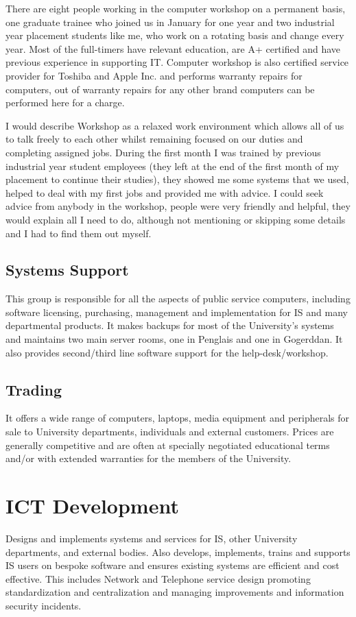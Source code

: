 \documentclass[10pt,a4paper,headinclude=true]{report}
\begin{document}
There are eight people working in the computer workshop on a permanent basis, one graduate trainee who joined us in January for one year and two industrial year placement students like me, who work on a rotating basis and change every year. Most of the full-timers have relevant education, are A+ certified\cite{A+} and have previous experience in supporting IT. Computer workshop is also certified service provider for Toshiba and Apple Inc. and performs warranty repairs for computers, out of warranty repairs for any other brand computers can be performed here for a charge. 

I would describe Workshop as a relaxed work environment which allows all of us to talk freely to each other whilst remaining focused on our duties and completing assigned jobs. During the first month I was trained by previous industrial year student employees (they left at the end of the first month of my placement to continue their studies), they showed me some systems that we used, helped to deal with my first jobs and provided me with advice. I could seek advice from anybody in the workshop, people were very friendly and helpful, they would explain all I need to do, although not mentioning or skipping some details and I had to find them out myself.
\subsection{Systems Support}
This group is responsible for all the aspects of public service computers, including software licensing, purchasing, management and implementation for IS and many departmental products. It makes backups for most of the University's systems and maintains two main server rooms, one in Penglais and one in Gogerddan. It also provides second/third line software support for the help-desk/workshop.\cite{InternalTeamdescription}
\subsection{Trading}
It offers a wide range of computers, laptops, media equipment and peripherals for sale to University departments, individuals and external customers. Prices are generally competitive and are often at specially negotiated educational terms and/or with extended warranties for the members of the University.\cite{InternalTeamdescription}

\section{ICT Development}
Designs and implements systems and services for IS, other University departments, and external bodies. Also develops, implements, trains and supports IS users on bespoke software and ensures existing systems are efficient and cost effective. This includes Network and Telephone service design promoting standardization and centralization and managing improvements and information security incidents.\cite{InternalTeamdescription}
\end{document}

